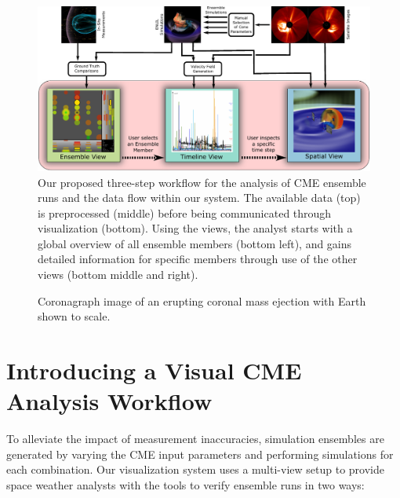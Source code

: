 \documentclass[journal]{vgtc}                %
\begin{document}
\begin{figure}
\centering
\includegraphics[width=\linewidth]{figures/workflow.pdf}
\caption{Our proposed three-step workflow for the analysis of CME ensemble runs and the data flow within our system. The available data (top) is preprocessed (middle) before being communicated through visualization (bottom). Using the views, the analyst starts with a global overview of all ensemble members (bottom left), and gains detailed information for specific members through use of the other views (bottom middle and right).}
\label{fig:workflow}
\end{figure}

\begin{figure}[!b]
\centering
\caption{Coronagraph image of an erupting coronal mass ejection with Earth shown to scale.}
\label{fig:cme}
\end{figure}

\section{Introducing a Visual CME Analysis Workflow}
To alleviate the impact of measurement inaccuracies, simulation ensembles are generated by varying the CME input parameters and performing simulations for each combination. Our visualization system uses a multi-view setup to provide space weather analysts with the tools to verify ensemble runs in two ways:
\end{document}

